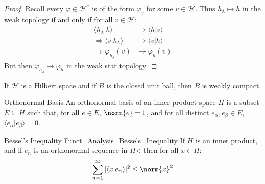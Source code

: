         \begin{proof}
            Recall every $\varphi\in\mathcal{H}^{*}$ is of the
            form $\varphi_{v}$ for some $v\in\mathcal{H}$.
            Thus $h_{\lambda}\mapsto{h}$ in the weak topology
            if and only if for all $v\in\mathcal{H}$:
            \begin{subequations}
                \begin{align}
                    \langle{h_{\lambda}|h}\rangle
                    &\rightarrow\langle{h|v}\rangle\\
                    \Longrightarrow
                    \langle{v|h_{\lambda}}\rangle
                    &\rightarrow\langle{v|h}\rangle\\
                    \Longrightarrow\varphi_{h_{\lambda}}(v)
                    &\rightarrow\varphi_{h}(v)
                \end{align}
            \end{subequations}
            But then $\varphi_{h_{\lambda}}\rightarrow\varphi_{h}$
            in the weak star topology.
        \end{proof}
        \begin{theorem}
            If $\mathcal{H}$ is a Hilbert space and if
            $B$ is the closed unit ball, then $B$ is
            weakly compact.
        \end{theorem}
        \begin{ldefinition}{Orthonormal Basis}
            An orthonormal basis of an inner product
            space $H$ is a subset $E\subseteq{H}$ such that, for
            all $e\in{E}$, $\norm{e}=1$, and for all distinct
            $e_{\alpha},e_{\beta}\in{E}$,
            $\langle{e_{\alpha}|e_{\beta}}\rangle=0$.
        \end{ldefinition}
        \begin{ltheorem}{Bessel's Inequality}
              {Funct_Analysis_Bessels_Inequality}
            If $H$ is an inner product, and if
            $e_{n}$ is an orthonormal sequence in $H$< then
            for all $x\in{H}$:
            \begin{equation}
                \sum_{n=1}^{\infty}|\langle{x|e_{n}}\rangle|^{2}
                    \leq\norm{x}^{2}
            \end{equation}
        \end{ltheorem}

